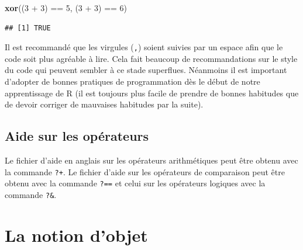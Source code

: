 \documentclass[twoside,symmetric]{book}
\newenvironment{Shaded}{}{}
\newcommand{\DecValTok}[1]{#1}
\newcommand{\KeywordTok}[1]{\textbf{#1}}
\newcommand{\NormalTok}[1]{#1}
\newcommand{\OperatorTok}[1]{#1}
\newcommand{\StringTok}[1]{#1}
\begin{document}
\begin{Shaded}
\begin{Highlighting}[]
\KeywordTok{xor}\NormalTok{((}\DecValTok{3} \OperatorTok{+}\StringTok{ }\DecValTok{3}\NormalTok{) }\OperatorTok{==}\StringTok{ }\DecValTok{5}\NormalTok{, (}\DecValTok{3} \OperatorTok{+}\StringTok{ }\DecValTok{3}\NormalTok{) }\OperatorTok{==}\StringTok{ }\DecValTok{6}\NormalTok{)}
\end{Highlighting}
\end{Shaded}

\begin{verbatim}
## [1] TRUE
\end{verbatim}

Il est recommandé que les virgules (\texttt{,}) soient suivies par un espace afin que le code soit plus agréable à lire. Cela fait beaucoup de recommandations sur le style du code qui peuvent sembler à ce stade superflues. Néanmoins il est important d'adopter de bonnes pratiques de programmation dès le début de notre apprentissage de R (il est toujours plus facile de prendre de bonnes habitudes que de devoir corriger de mauvaises habitudes par la suite).

\hypertarget{aide-sur-les-opuxe9rateurs}{%
\subsection{Aide sur les opérateurs}\label{aide-sur-les-opuxe9rateurs}}

Le fichier d'aide en anglais sur les opérateurs arithmétiques peut être obtenu avec la commande \texttt{?\textquotesingle{}+\textquotesingle{}}. Le fichier d'aide sur les opérateurs de comparaison peut être obtenu avec la commande \texttt{?\textquotesingle{}==\textquotesingle{}} et celui sur les opérateurs logiques avec la commande \texttt{?\textquotesingle{}\&\textquotesingle{}}.

\hypertarget{l011object}{%
\section{La notion d'objet}\label{l011object}}
\end{document}
